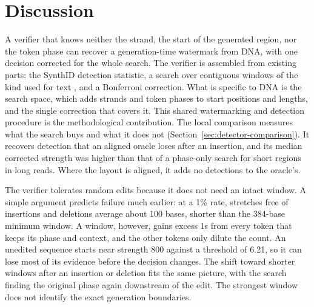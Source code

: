 \documentclass[10pt,twocolumn]{article}
\begin{document}
\begin{table}[tp]
\centering
\caption{Spearman correlation of the mean entropy of a marked sequence with its strength and with
the fraction of its mark bits equal to 1, in the local cohort (1{,}024 sequences from 512 prompts per
model). Brackets give 95\% intervals from a bootstrap over prompts with 10{,}000 replicates.}
\label{tab:entropy}
\footnotesize
\setlength{\tabcolsep}{3pt}
\renewcommand{\arraystretch}{1.08}

\end{table}

\section{Discussion}

A verifier that knows neither the strand, the start of the generated region, nor the token phase
can recover a generation-time watermark from DNA, with one decision corrected for the whole search.
The verifier is assembled from existing parts: the SynthID detection statistic, a search over
contiguous windows of the kind used for text \cite{kirchenbauer2024reliability}, and a Bonferroni
correction. What is specific to DNA is the search space, which adds strands and token phases to
start positions and lengths, and the single correction that covers it. This shared watermarking
and detection procedure is the methodological contribution. The local comparison measures what the
search buys and what it does not (Section~\ref{sec:detector-comparison}). It recovers detection that
an aligned oracle loses after an insertion, and its median corrected strength was higher than that of a phase-only search for short regions
in long reads. Where the layout is aligned, it adds no detections to the oracle's.

The verifier tolerates random edits because it does not need an intact window. A simple argument
predicts failure much earlier: at a 1\% rate, stretches free of insertions and deletions average
about 100 bases, shorter than the 384-base minimum window. A window, however, gains excess 1s from
every token that keeps its phase and context, and the other tokens only dilute the count. An
unedited sequence starts near strength 800 against a threshold of 6.21, so it can lose most of its
evidence before the decision changes. The shift toward shorter windows after an insertion or
deletion fits the same picture, with the search finding the original phase again downstream of the
edit. The strongest window does not identify the exact generation boundaries.
\end{document}
